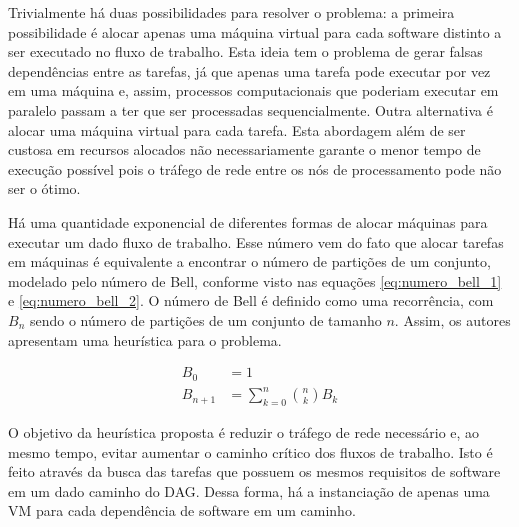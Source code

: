 Trivialmente há duas possibilidades para resolver o problema: a primeira
possibilidade é alocar apenas uma máquina virtual para cada software distinto a
ser executado no fluxo de trabalho. Esta ideia tem o problema de gerar falsas
dependências entre as tarefas, já que apenas uma tarefa pode executar por vez 
em uma máquina e, assim, processos computacionais que poderiam executar em 
paralelo passam a ter que ser processadas sequencialmente. Outra alternativa é
alocar uma máquina virtual para cada tarefa. Esta abordagem além de ser custosa 
em recursos alocados não necessariamente garante o menor tempo de execução
possível pois o tráfego de rede entre os nós de processamento pode não ser o
ótimo.

Há uma quantidade exponencial de diferentes formas de alocar máquinas para 
executar um dado fluxo de trabalho. Esse número vem do fato que alocar tarefas
em máquinas é equivalente a encontrar o número de partições de um conjunto, 
modelado pelo número de Bell, conforme visto nas equações \ref{eq:numero_bell_1}
e \ref{eq:numero_bell_2}. O número de Bell é definido como uma recorrência,
com $B_n$ sendo o número de partições de um conjunto de tamanho $n$.
Assim, os autores apresentam uma heurística para o problema.

\begin{align} \label{eq:numero_bell_1}
	B_0 &= 1\\ \label{eq:numero_bell_2}
	B_{n+1} &= \sum_{k=0}^{n}{{n \choose k}B_k}
\end{align}

O objetivo da heurística proposta é reduzir o tráfego de rede necessário e, 
ao mesmo tempo, evitar aumentar o caminho crítico dos fluxos de trabalho.
Isto é feito através da busca das tarefas que possuem os mesmos requisitos de
software em um dado caminho do DAG. Dessa forma, há a instanciação de apenas uma
VM para cada dependência de software em um caminho.

%


